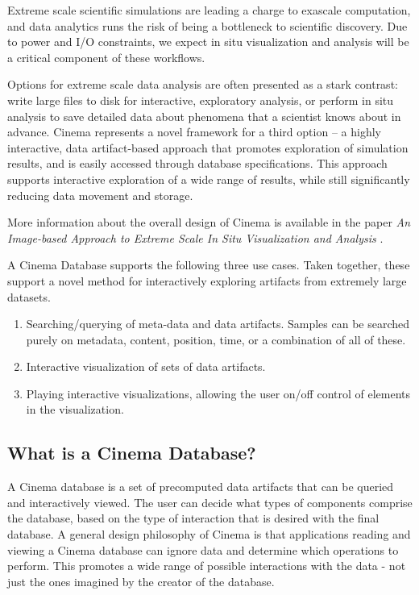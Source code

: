 \label{sec:cinema}

Extreme scale scientific simulations are leading a charge to exascale computation, and data analytics runs the risk of being a bottleneck to scientific discovery. Due to power and I/O constraints, we expect in situ visualization and analysis will be a critical component of these workflows. 

Options for extreme scale data analysis are often presented as a stark contrast: write large files to disk for interactive, exploratory analysis, or perform in situ analysis to save detailed data about phenomena that a scientist knows about in advance. Cinema represents a novel framework for a third option – a highly interactive, data artifact-based approach that promotes exploration of simulation results, and is easily accessed through database specifications. This approach supports interactive exploration of a wide range of results, while still significantly reducing data movement and storage.

More information about the overall design of Cinema is available in the paper \textit{An Image-based Approach to Extreme Scale In Situ Visualization and Analysis} \cite{cinemaSC14}.

A Cinema Database supports the following three use cases. Taken together, these support a novel method for interactively exploring artifacts from extremely large datasets.

\begin{enumerate}
\item Searching/querying of meta-data and data artifacts. Samples can be searched purely on metadata, content, position, time, or a combination of all of these.
\item Interactive visualization of sets of data artifacts.
\item Playing interactive visualizations, allowing the user on/off control of elements in the visualization.
\end{enumerate}

\subsection{What is a Cinema Database?}
A Cinema database is a set of precomputed data artifacts that can be queried and interactively viewed. The user can decide what types of components comprise the database, based on the type of interaction that is desired with the final database.
A general design philosophy of Cinema is that applications reading and viewing a Cinema database can ignore data and determine which operations to perform. This promotes a wide range of possible interactions with the data - not just the ones imagined by the creator of the database.

